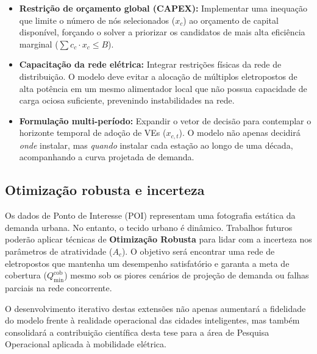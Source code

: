 \begin{itemize}
    \item \textbf{Restrição de orçamento global (CAPEX):} Implementar uma inequação que limite o número de nós selecionados ($x_c$) ao orçamento de capital disponível, forçando o solver a priorizar os candidatos de mais alta eficiência marginal ($ \sum c_c \cdot x_c \leq B $).
    \item \textbf{Capacitação da rede elétrica:} Integrar restrições físicas da rede de distribuição. O modelo deve evitar a alocação de múltiplos eletropostos de alta potência em um mesmo alimentador local que não possua capacidade de carga ociosa suficiente, prevenindo instabilidades na rede.
    \item \textbf{Formulação multi-período:} Expandir o vetor de decisão para contemplar o horizonte temporal de adoção de VEs ($x_{c,t}$). O modelo não apenas decidirá \textit{onde} instalar, mas \textit{quando} instalar cada estação ao longo de uma década, acompanhando a curva projetada de demanda.
\end{itemize}

\subsection{Otimização robusta e incerteza}

Os dados de Ponto de Interesse (POI) representam uma fotografia estática da demanda urbana. No entanto, o tecido urbano é dinâmico. Trabalhos futuros poderão aplicar técnicas de \textbf{Otimização Robusta} para lidar com a incerteza nos parâmetros de atratividade ($A_c$). O objetivo será encontrar uma rede de eletropostos que mantenha um desempenho satisfatório e garanta a meta de cobertura ($Q_{\min}^{\text{cob}}$) mesmo sob os piores cenários de projeção de demanda ou falhas parciais na rede concorrente.

\vspace{0.5cm}
O desenvolvimento iterativo destas extensões não apenas aumentará a fidelidade do modelo frente à realidade operacional das cidades inteligentes, mas também consolidará a contribuição científica desta tese para a área de Pesquisa Operacional aplicada à mobilidade elétrica.